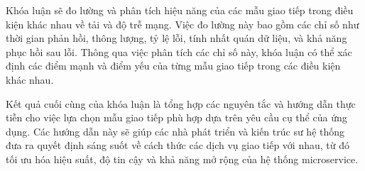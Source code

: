 Khóa luận sẽ đo lường và phân tích hiệu năng của các mẫu giao tiếp trong điều
kiện khác nhau về tải và độ trễ mạng. Việc đo lường này bao gồm các chỉ số như
thời gian phản hồi, thông lượng, tỷ lệ lỗi, tính nhất quán dữ liệu, và khả năng
phục hồi sau lỗi. Thông qua việc phân tích các chỉ số này, khóa luận có thể xác
định các điểm mạnh và điểm yếu của từng mẫu giao tiếp trong các điều kiện khác
nhau.

Kết quả cuối cùng của khóa luận là tổng hợp các nguyên tắc và hướng dẫn thực
tiễn cho việc lựa chọn mẫu giao tiếp phù hợp dựa trên yêu cầu cụ thể của ứng
dụng. Các hướng dẫn này sẽ giúp các nhà phát triển và kiến trúc sư hệ thống đưa
ra quyết định sáng suốt về cách thức các dịch vụ giao tiếp với nhau, từ đó tối
ưu hóa hiệu suất, độ tin cậy và khả năng mở rộng của hệ thống microservice.